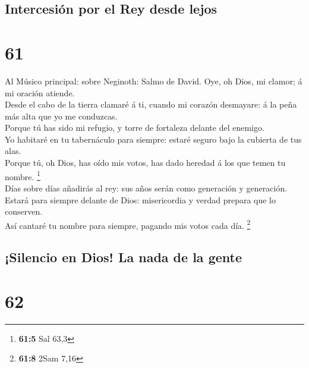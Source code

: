 \hypertarget{intercesiuxf3n-por-el-rey-desde-lejos}{%
\subsection{Intercesión por el Rey desde
lejos}\label{intercesiuxf3n-por-el-rey-desde-lejos}}

\hypertarget{section-60}{%
\section{61}\label{section-60}}

 Al Músico principal: sobre Neginoth: Salmo de David. Oye,
oh Dios, mi clamor; á mi oración atiende.\\
 Desde el cabo de la tierra clamaré á ti, cuando mi corazón
desmayare: á la peña más alta que yo me conduzcas.\\
 Porque tú has sido mi refugio, y torre de fortaleza delante
del enemigo.\\
 Yo habitaré en tu tabernáculo para siempre: estaré seguro
bajo la cubierta de tus alas.\\
 Porque tú, oh Dios, has oído mis votos, has dado heredad á
los que temen tu nombre. \footnote{\textbf{61:5} Sal 63,3}\\
 Días sobre días añadirás al rey: sus años serán como
generación y generación.\\
 Estará para siempre delante de Dios: misericordia y verdad
prepara que lo conserven.\\
 Así cantaré tu nombre para siempre, pagando mis votos cada
día. \footnote{\textbf{61:8} 2Sam 7,16}

\hypertarget{silencio-en-dios-la-nada-de-la-gente}{%
\subsection{¡Silencio en Dios! La nada de la
gente}\label{silencio-en-dios-la-nada-de-la-gente}}

\hypertarget{section-61}{%
\section{62}\label{section-61}}

